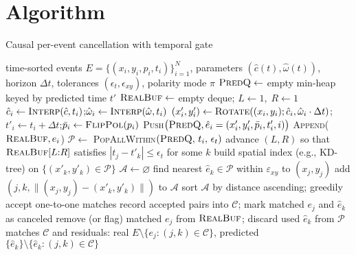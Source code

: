 \section{Algorithm}
\begin{algorithm}[H] %
\caption{Causal per-event cancellation with temporal gate}
\label{alg:cancellation}
\begin{algorithmic}[1]
\Require time-sorted events $E=\{(x_i,y_i,p_i,t_i)\}_{i=1}^N$, parameters $(\hat c(t),\hat\omega(t))$, horizon $\Delta t$, tolerances $(\epsilon_t,\epsilon_{xy})$, polarity mode $\pi$
\State $\textsc{PredQ}\gets$ empty min-heap keyed by predicted time $t'$
\State $\textsc{RealBuf}\gets$ empty deque; \quad $L\gets 1,\; R\gets 1$
  \State $\hat c_i \gets \textsc{Interp}(\hat c,t_i)$;\quad $\hat{\omega}_i \gets \textsc{Interp}(\hat\omega,t_i)$
  \State $(x'_i,y'_i)\gets \textsc{Rotate}((x_i,y_i);\hat c_i,\hat{\omega}_i\cdot \Delta t)$;\quad $t'_i\gets t_i+\Delta t$;\quad $\bar p_i\gets \textsc{FlipPol}(p_i)$
  \State \textsc{Push}$\big(\textsc{PredQ},\hat e_i=(x'_i,y'_i,\bar p_i,t'_i,i)\big)$
  \State \textsc{Append}($\textsc{RealBuf}, e_i$)
     \State $\mathcal{P}\gets$ \textsc{PopAllWithin}$(\textsc{PredQ},\,t_i,\,\epsilon_t)$ 
     \State advance $(L,R)$ so that $\textsc{RealBuf}[L{:}R]$ satisfies $|t_j - t'_k|\le \epsilon_t$ for some $k$ \label{ln:window}
     \State build spatial index (e.g., KD-tree) on $\{(x'_k,y'_k)\in\mathcal{P}\}$
     \State $\mathcal{A}\gets\varnothing$ 
        \State find nearest $\hat e_k\in\mathcal{P}$ within $\varepsilon_{xy}$ to $(x_j,y_j)$
            \State add $(j,k,\| (x_j,y_j)-(x'_k,y'_k)\|)$ to $\mathcal{A}$
        \EndIf
     \EndFor
     \State sort $\mathcal{A}$ by distance ascending; greedily accept one-to-one matches
     \State record accepted pairs into $\mathcal{C}$; mark matched $e_j$ and $\hat e_k$ as canceled
     \State remove (or flag) matched $e_j$ from $\textsc{RealBuf}$; discard used $\hat e_k$ from $\mathcal{P}$
  \EndWhile
\EndFor
\State \Return matches $\mathcal{C}$ and residuals: real $E\setminus\{e_j:(j,k)\in\mathcal{C}\}$, predicted $\{\hat e_k\}\setminus\{\hat e_k:(j,k)\in\mathcal{C}\}$
\end{algorithmic}
\end{algorithm}


